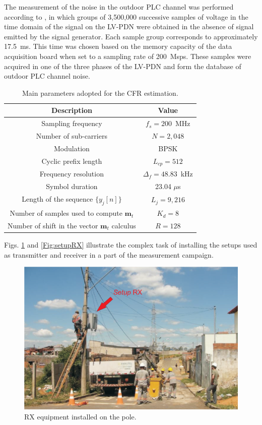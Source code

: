 \documentclass[journal]{IEEEtran}
\begin{document}
The measurement of the noise in the outdoor PLC channel was performed according to \cite{Andrade2013}, in which groups of 3,500,000 successive samples of voltage in the time domain of the signal on the \ac{LV-PDN} were obtained in the absence of signal emitted by the signal generator. Each sample group corresponds to approximately 17.5~ms. This time was chosen based on the memory capacity of the data acquisition board when set to a sampling rate of 200~Msps. These samples were acquired in one of the three phases of the \ac{LV-PDN} and form the database of outdoor PLC channel noise.

\begin{table}[!htp]
\centering
  \caption{Main parameters adopted for the CFR estimation.}
  \label{tab:setup_parameters}
\begin{tabular}{c|c}
\hline\hline
Description&Value\\
\hline\hline
Sampling frequency&$f_s=200$~MHz\\
\hline
Number of sub-carriers  &$N=2,048$ \\
\hline
Modulation         &BPSK \\
\hline
Cyclic prefix length       &$L_{cp}=512$ \\
\hline
Frequency resolution&$\Delta_f = 48.83$~kHz\\
\hline
Symbol duration & 23.04 $\mu$s \\
\hline
Length of the sequence $\{y_{j}[n]\}$    &$L_{j}=9,216$ \\
\hline
Number of samples used to compute $\textbf{m}_{t}$     &$K_{d}=8$ \\
\hline
Number of shift in the vector $\textbf{m}_{t}$  calculus       &$R=128$ \\
\hline
\end{tabular}
\end{table}


Figs. \ref{Fig:setupTX} and \ref{Fig:setupRX} illustrate the complex task of installing the setups used as transmitter and receiver in a part of the measurement campaign.
\begin{figure}[!htp]
	\begin{centering}
		\includegraphics[scale=.4]{Figuras/setupRXnoposte.eps}
		\caption{RX equipment installed on the pole.}
       \label{Fig:setupTX}
     \end{centering}
 \end{figure}
 
\end{document}
